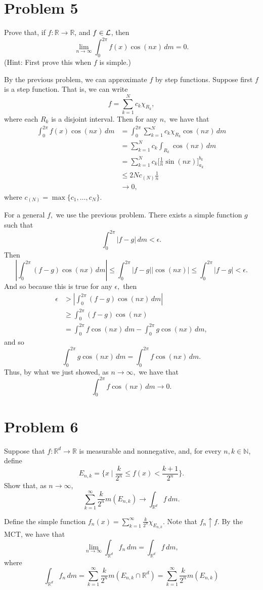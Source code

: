\documentclass[11pt]{article}
\newcommand{\bbR}{\mathbb{R}}
\begin{document}
\newpage
\section*{Problem 5}
Prove that, if \( f: \mathbb{R} \to \mathbb{R} \), and \( f \in \cal L \), then
\[
\lim_{n \to \infty} \int_{0}^{2\pi} f(x) \cos(nx) \, dm = 0.
\]
(Hint: First prove this when \( f \) is simple.)
\begin{solution}
By the previous problem, we can approximate $f$ by step functions. Suppose first $f$ is a step function. That is, we can write 
\[f = \sum_{k= 1}^N c_k \chi_{R_k},\] where each $R_k$ is a disjoint interval. Then for any $n,$ we have that
\begin{align*}
    \int_{0}^{2\pi} f(x)\cos(nx) \, dm &= \int_{0}^{2\pi} \sum_{k=1}^N c_k \chi_{R_k}\cos(nx) \, dm\\
    &= \sum_{k=1}^N c_k\int_{R_k} \cos(nx)\, dm\\
    &= \sum_{k=1}^N c_k \bigg[\frac{1}{n}\sin(nx)\bigg]_{a_k}^{b_k}\\
    &\leq 2 Nc_{(N)} \frac{1}{n}\\
    &\to 0,
\end{align*}
where $c_{(N)} = \max\{c_1, \dots, c_N\}.$ 

For a general $f,$ we use the previous problem. There exists a simple function $g$ such that 
\[\int_{0}^{2\pi} |f - g|\, dm < \epsilon.\] Then 
\[\left|\int_0^{2\pi} (f - g)\cos(nx)\, dm\right| \leq \int_0^{2\pi} |f - g||\cos(nx)| \leq \int_0^{2\pi} |f-g| < \epsilon.\] And so because this is true for any $\epsilon,$ then
\begin{align*}
\epsilon &>\left|\int_0^{2\pi} (f - g)\cos(nx)\, dm\right|\\
& \geq \int_0^{2\pi} (f - g)\cos(nx)\\
&= \int_0^{2\pi} f \cos(nx)\, dm - \int_0^{2\pi} g \cos(nx)\, dm,
\end{align*}
and so \[\int_0^{2\pi} g \cos(nx)\, dm = \int_0^{2\pi} f \cos(nx)\, dm.\] Thus, by what we just showed, as $n\to \infty,$ we have that 
\[\int_0^{2\pi} f \cos(nx)\, dm \to 0.\]


    
\end{solution}


\newpage
\section*{Problem 6}
Suppose that \( f: \mathbb{R}^d \to \mathbb{R} \) is measurable and nonnegative, and, for every \( n, k \in \mathbb{N} \), define
\[
E_{n,k} = \{x \mid \frac{k}{2^n} \leq f(x) < \frac{k+1}{2^n}\}.
\]
Show that, as \( n \to \infty \),
\[
\sum_{k=1}^{\infty} \frac{k}{2^n}m(E_{n,k}) \to \int_{\mathbb{R}^d} f \, dm.
\]
\begin{solution}
    Define the simple function $f_{n}(x) = \sum_{k=1}^\infty \frac{k}{2^n}\chi_{E_{n,k}}.$ Note that $f_n \uparrow f.$ By the MCT, we have that
    \[\lim_{n\to \infty}\int_{\bbR^d} f_n \, dm = \int_{\bbR^d} f \, dm,\] where 
    \[\int_{\bbR^d} f_{n} \, dm = \sum_{k=1}^\infty \frac{k}{2^n}m(E_{n,k} \cap \bbR^d) = \sum_{k=1}^\infty \frac{k}{2^n}m(E_{n,k}) \]
\end{solution}
\end{document}
